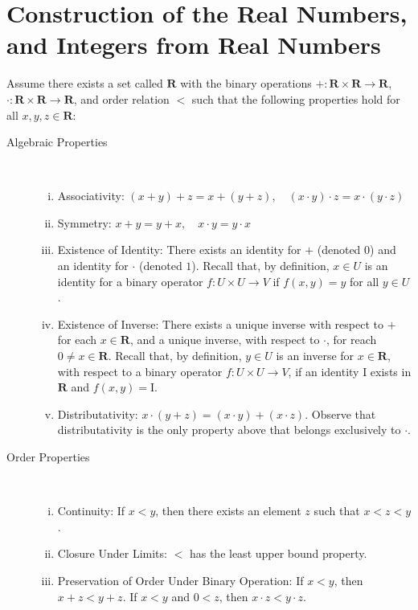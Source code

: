 \section{Construction of the Real Numbers, and Integers from Real Numbers}
\begin{definition}
Assume there exists a set called $\mathbf{R}$ with the binary operations $+: \mathbf{R} \times
\mathbf{R} \to \mathbf{R}$, $\cdot: \mathbf{R} \times \mathbf{R} \to \mathbf{R}$, and order relation $<$
such that the following properties hold for all $x,y,z \in \mathbf{R}$:
\begin{description}
\item[Algebraic Properties]\
\begin{enumerate}[(i)]
  \item{Associativity:} $(x + y) + z = x + (y+z), \quad (x \cdot y) \cdot z = x
  \cdot (y \cdot z)$
  \item{Symmetry:} $x + y = y + x, \quad x \cdot y = y \cdot x$
  \item{Existence of Identity:} There exists an identity for $+$ (denoted $0$) and
  an identity for $\cdot$ (denoted $1$). Recall that, by definition, $x \in U$
  is an identity for a binary operator $f: U\times U \to V$ if $f(x,y) = y$ for
  all $y \in U$.
  \item{Existence of Inverse:} There exists a unique inverse
  with respect to $+$ for each $x \in \mathbf{R}$, and a unique inverse, with respect
  to $\cdot$, for reach $0 \neq x \in \mathbf{R}$. Recall that, by definition,
  $y \in U$ is an inverse for $x \in \mathbf{R}$, with respect to a binary operator $f:
  U \times U \to V$, if an identity I exists in $\mathbf{R}$ and $f(x,y) = \mathrm{I}$.
  \item{Distributativity:} $x \cdot (y+z) = (x \cdot y) + (x \cdot z)$.
  Observe that distributativity is the only property above that belongs
  exclusively to $\cdot$.
\end{enumerate}
\item[Order Properties]\
\begin{enumerate}[(vi)]
  \item{Continuity:}
  If $x<y$, then there exists an element $z$ such that $x <z < y$.
  \item{Closure Under Limits:} $<$ has the least upper bound property.
  \item{Preservation of Order Under Binary Operation:} If $x < y$, then $x + z < y
  + z$. If $x < y$ and $0 < z$, then $x \cdot z < y \cdot z$.
\end{enumerate}
\end{description}
\end{definition}

